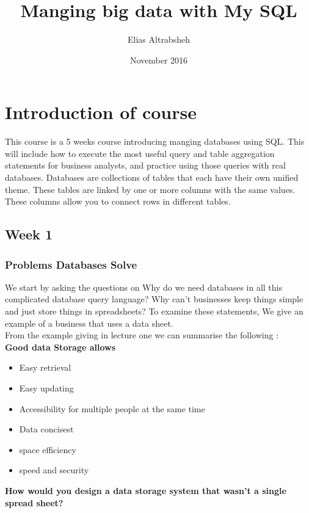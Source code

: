 \documentclass{article}
\title{Manging big data with My SQL}
\author{Elias  Altrabsheh}
\date{November 2016}
\begin{document}
\maketitle

\section*{Introduction of course}

This course is a 5 weeks course introducing manging databases using SQL. This will include how to execute the most useful query and table aggregation statements for business analysts, and practice using those queries with real databases. Databases are collections of tables that each have their own unified theme. These tables are linked by one or more columns with the same values. These columns allow you to connect rows in different tables. 

\subsection*{Week 1}
\subsubsection*{Problems Databases Solve}

We start by asking the questions on  Why do we need databases in all this complicated database query language? Why can't businesses keep things simple and just store things in spreadsheets? To examine these statements, We give an example of a business that uses a data sheet.\\

\noindent From the example giving in lecture one we can summarise the following :\\

\textbf{Good data Storage allows}

\begin{itemize}
    \item Easy retrieval 
    \item Easy updating
    \item Accessibility for multiple people at the same time
    \item Data concisest
    \item space efficiency 
    \item speed and security
\end{itemize}

\textbf{How would you design a data storage system that wasn't a single spread sheet?}
\end{document}
